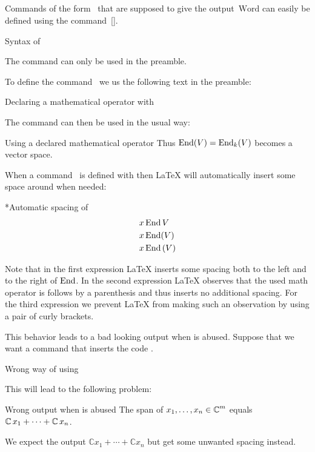 \subsection{}

Commands of the form~ that are supposed to give the output~$\mathrm{Word}$ can easily be defined using the command~[\comname].
\begin{showcode}{Syntax of~}
\DeclareMathOperator{\Word}{Word}
\end{showcode}
The command  can only be used in the preamble.

To define the command~ we us the following text in the preamble:
\begin{showcode}{Declaring a mathematical operator with~}
\DeclareMathOperator{\End}{End}
\end{showcode}
The command  can then be used in the usual way:
\begin{showlatex}{Using a declared mathematical operator}
Thus $\End(V) = \End_k(V)$ becomes a vector space.
\end{showlatex}

When a command~ is defined with  then {\LaTeX} will automatically insert some space around  when needed:
\begin{showlatex}*{Automatic spacing of~}
\begin{align*}
&x \End V
\\
&x \End(V)
\\
&x \End {(V)}
\end{align*}
\end{showlatex}
Note that in the first expression {\LaTeX} inserts some spacing both to the left and to the right of $\End$.
In the second expression {\LaTeX} observes that the used math operator is follows by a parenthesis and thus inserts no additional spacing.
For the third expression we prevent {\LaTeX} from making such an observation by using a pair of curly brackets.

This behavior leads to a bad looking output when  is abused.
Suppose that we want a command  that inserts the code .
\begin{showcode}{Wrong way of using }
\DeclareMathOperator{\Complex}{\mathbb{C}}
\end{showcode}
This will lead to the following problem:
\begin{showlatex}{Wrong output when  is abused}
The span of $x_1, \dotsc, x_n \in \Complex^m$ equals $\Complex x_1 + \dotsb + \Complex x_n$.
\end{showlatex}
We expect the output $\mathbb{C} x_1 + \dotsb + \mathbb{C} x_n$ but get some unwanted spacing instead.



